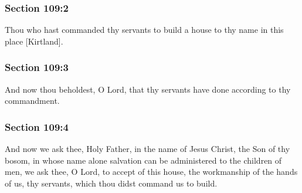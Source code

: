 
	\subsubsection{Section 109:2} %
		\label{DC109-2}

		Thou who hast commanded thy servants to build a house to thy name in this place [Kirtland].


	\subsubsection{Section 109:3} %
		\label{DC109-3}

		And now thou beholdest, O Lord, that thy servants have done according to thy commandment.


	\subsubsection{Section 109:4} %
		\label{DC109-4}

		And now we ask thee, Holy Father, in the name of Jesus Christ, the Son of thy bosom, in whose name alone salvation can be administered to the children of men, we ask thee, O Lord, to accept of this house, the workmanship of the hands of us, thy servants, which thou didst command us to build.

